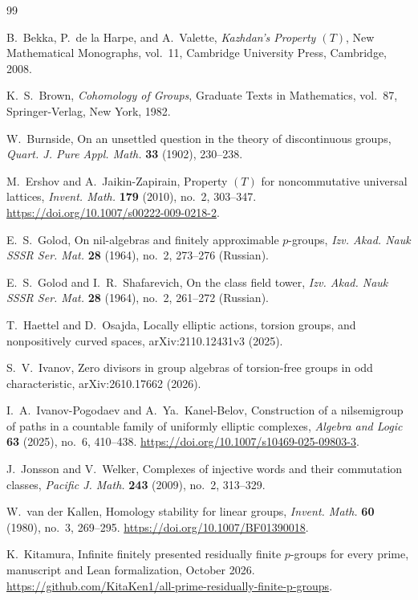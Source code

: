\begin{thebibliography}{99}

B.~Bekka, P.~de la Harpe, and A.~Valette,
\emph{Kazhdan's Property $(T)$},
New Mathematical Monographs, vol.~11,
Cambridge University Press, Cambridge, 2008.

K.~S.~Brown,
\emph{Cohomology of Groups},
Graduate Texts in Mathematics, vol.~87,
Springer-Verlag, New York, 1982.

W.~Burnside,
On an unsettled question in the theory of discontinuous groups,
\emph{Quart. J. Pure Appl. Math.} \textbf{33} (1902), 230--238.

M.~Ershov and A.~Jaikin-Zapirain,
Property $(T)$ for noncommutative universal lattices,
\emph{Invent. Math.} \textbf{179} (2010), no.~2, 303--347.
\url{https://doi.org/10.1007/s00222-009-0218-2}.

E.~S.~Golod,
On nil-algebras and finitely approximable $p$-groups,
\emph{Izv. Akad. Nauk SSSR Ser. Mat.} \textbf{28} (1964), no.~2, 273--276 (Russian).

E.~S.~Golod and I.~R.~Shafarevich,
On the class field tower,
\emph{Izv. Akad. Nauk SSSR Ser. Mat.} \textbf{28} (1964), no.~2, 261--272 (Russian).

T.~Haettel and D.~Osajda,
Locally elliptic actions, torsion groups, and nonpositively curved spaces,
arXiv:2110.12431v3 (2025).

S.~V.~Ivanov,
Zero divisors in group algebras of torsion-free groups in odd characteristic,
arXiv:2610.17662 (2026).

I.~A.~Ivanov-Pogodaev and A.~Ya.~Kanel-Belov,
Construction of a nilsemigroup of paths in a countable family of uniformly elliptic complexes,
\emph{Algebra and Logic} \textbf{63} (2025), no.~6, 410--438.
\url{https://doi.org/10.1007/s10469-025-09803-3}.

J.~Jonsson and V.~Welker,
Complexes of injective words and their commutation classes,
\emph{Pacific J. Math.} \textbf{243} (2009), no.~2, 313--329.

W.~van der Kallen,
Homology stability for linear groups,
\emph{Invent. Math.} \textbf{60} (1980), no.~3, 269--295.
\url{https://doi.org/10.1007/BF01390018}.

K.~Kitamura,
Infinite finitely presented residually finite $p$-groups for every prime,
manuscript and Lean formalization, October 2026.
\url{https://github.com/KitaKen1/all-prime-residually-finite-p-groups}.


\end{thebibliography}
